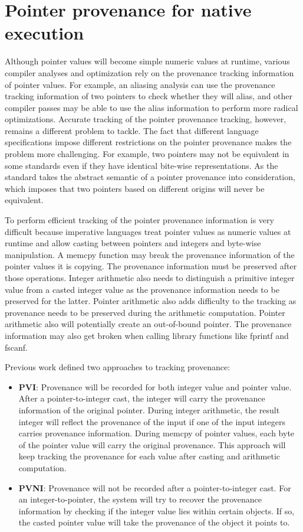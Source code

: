 \documentclass[sigplan, nonacm]{acmart}\settopmatter{printfolios=true,printccs=false,printacmref=false}
\begin{document}
\section{Pointer provenance for native execution}\label{nativeprovenance}
Although pointer values will become simple numeric values at runtime, various compiler analyses and optimization rely on the provenance tracking information of pointer values. For example, an aliasing analysis can use the provenance tracking information of two pointers to check whether they will alias, and other compiler passes may be able to use the alias information to perform more radical optimizations. Accurate tracking of the pointer provenance tracking, however, remains a different problem to tackle. The fact that different language specifications impose different restrictions on the pointer provenance makes the problem more challenging. For example, two pointers may not be equivalent in some standards even if they have identical bite-wise representations. As the standard takes the abstract semantic of a pointer provenance into consideration, which imposes that two pointers based on different origins will never be equivalent.\par
To perform efficient tracking of the pointer provenance information is very difficult because imperative languages treat pointer values as numeric values at runtime and allow casting between pointers and integers and byte-wise manipulation. A memcpy function may break the provenance information of the pointer values it is copying. The provenance information must be preserved after those operations. Integer arithmetic also needs to distinguish a primitive integer value from a casted integer value as the provenance information needs to be preserved for the latter. Pointer arithmetic also adds difficulty to the tracking as provenance needs to be preserved during the arithmetic computation. Pointer arithmetic also will potentially create an out-of-bound pointer. The provenance information may also get broken when calling library functions like fprintf and fscanf.\par
Previous work\cite{memarian2019exploring} defined two approaches to tracking provenance:
\begin{itemize}
  \item \textbf{PVI}: Provenance will be recorded for both integer value and pointer value. After a pointer-to-integer cast, the integer will carry the provenance information of the original pointer. During integer arithmetic, the result integer will reflect the provenance of the input if one of the input integers carries provenance information. During memcpy of pointer values, each byte of the pointer value will carry the original provenance. This approach will keep tracking the provenance for each value after casting and arithmetic computation.
  \item \textbf{PVNI}: Provenance will not be recorded after a pointer-to-integer cast. For an integer-to-pointer, the system will try to recover the provenance information by checking if the integer value lies within certain objects. If so, the casted pointer value will take the provenance of the object it points to.
\end{itemize}
\end{document}
